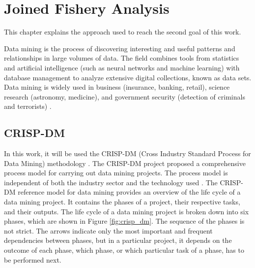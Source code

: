 % 
% 
%
\chapter{Joined Fishery Analysis}
\label{cha:server}
This chapter explains the approach used to reach the second goal of this work. 


Data mining is the process of discovering interesting and useful patterns and relationships in large volumes of data. The field combines tools from statistics and artificial intelligence (such as neural networks and machine learning) with database management to analyze extensive digital collections, known as data sets. Data mining is widely used in business (insurance, banking, retail), science research (astronomy, medicine), and government security (detection of criminals and terrorists) \cite{Okonkwo2011COMBATINGCA}. 

\section{CRISP-DM} %
\label{sub:crisp_dm}

In this work, it will be used the CRISP-DM (Cross Industry Standard Process for Data Mining) methodology \cite{CRISPDM}.
The CRISP-DM project proposed a comprehensive process model for carrying out data mining projects. The process model is independent of both the industry sector and the technology used \cite{CRISPDM}. 
The CRISP-DM reference model for data mining provides an overview of the life cycle of a data
mining project. It contains the phases of a project, their respective tasks, and their outputs.
The life cycle of a data mining project is broken down into six phases, which are shown in Figure \ref{fig:crisp_dm}.
The sequence of the phases is not strict. The arrows indicate only the most important and frequent
dependencies between phases, but in a particular project, it depends on the outcome of each phase,
which phase, or which particular task of a phase, has to be performed next.

